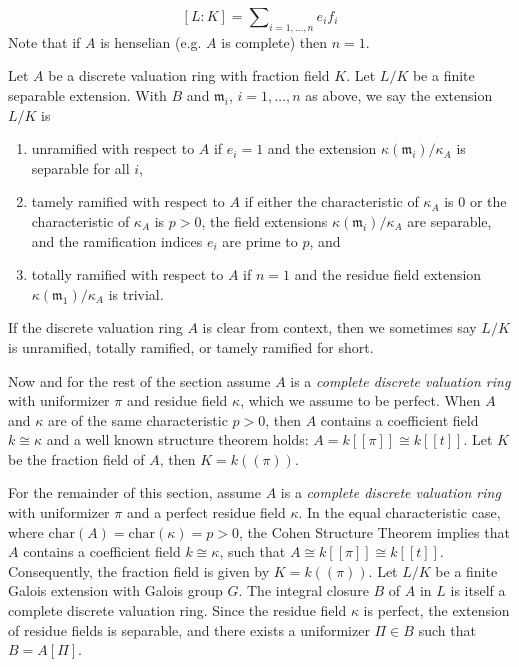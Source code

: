 \[ [L : K] = \sum \nolimits _{i = 1, \ldots , n} e_ i f_ i \]
Note that if $A$ is henselian (e.g. $A$ is complete) then $n=1$. 

\begin{definition}[\stackstag{09E9}]\label{definition:tamely_ramified_dvrs:reorg}
Let $A$ be a discrete valuation ring with fraction field $K$. Let $L/K$ be a finite separable extension. With $B$ and $\mathfrak m_ i$, $i = 1, \ldots , n$ 
as above, we say the extension $L/K$ is
\begin{enumerate}
    \item unramified with respect to $A$ if $e_ i = 1$ and the extension $\kappa (\mathfrak m_ i)/\kappa _ A$ is separable for all $i$,
    \item tamely ramified with respect to $A$ if either the characteristic of $\kappa _ A$ is $0$ or the characteristic of $\kappa _ A$ is $p > 0$, the field extensions $\kappa (\mathfrak m_ i)/\kappa _ A$ are separable, and the ramification indices $e_ i$ are prime to $p$, and
    \item totally ramified with respect to $A$ if $n = 1$ and the residue field extension $\kappa (\mathfrak m_1)/\kappa _ A$ is trivial.
\end{enumerate}
If the discrete valuation ring $A$ is clear from context, then we sometimes say $L/K$ is unramified, totally ramified, or tamely ramified for short.
\end{definition}

Now and for the rest of the section assume $A$ is a \textit{complete discrete valuation ring} with uniformizer $\pi$ 
and residue field $\kappa$, which we assume to be perfect. When $A$ and $\kappa$ are of the same characteristic $p > 0$, 
then $A$ contains a coefficient field $k \cong \kappa$ and a well known structure theorem holds: $A = k[[\pi ]] \cong k[[t]]$.
Let $K$ be the fraction field of $A$, then $K=k((\pi))$.

For the remainder of this section, assume $A$ is a \textit{complete discrete valuation ring} with uniformizer $\pi$ and a perfect residue 
field $\kappa$. In the equal characteristic case, where $\text{char}(A) = \text{char}(\kappa) = p > 0$, the 
Cohen Structure Theorem implies that $A$ contains a coefficient field $k \cong \kappa$, such that $A \cong k[[\pi]] \cong k[[t]]$. 
Consequently, the fraction field is given by $K = k((\pi))$.
Let $L/K$ be a finite Galois extension with Galois group $G$. 
The integral closure $B$ of $A$ in $L$ is itself a complete discrete valuation ring. 
Since the residue field $\kappa$ is perfect, the extension of residue fields is separable, and there exists a uniformizer 
$\Pi \in B$ such that $B = A[\Pi]$.

